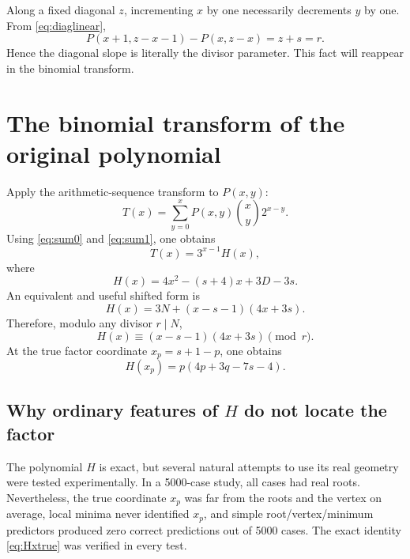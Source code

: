 \documentclass[11pt,a4paper]{article}
\begin{document}
Along a fixed diagonal \(z\), incrementing \(x\) by one necessarily decrements \(y\) by one. From \eqref{eq:diaglinear},
\begin{equation}
\boxed{
P(x+1,z-x-1)-P(x,z-x)=z+s=r.
}
\label{eq:slope}
\end{equation}
Hence the diagonal slope is literally the divisor parameter. This fact will reappear in the binomial transform.

\section{The binomial transform of the original polynomial}
\label{sec:H}

Apply the arithmetic-sequence transform to \(P(x,y)\):
\begin{equation}
T(x)=\sum_{y=0}^{x}P(x,y)\binom{x}{y}2^{x-y}.
\label{eq:T}
\end{equation}
Using \eqref{eq:sum0} and \eqref{eq:sum1}, one obtains
\begin{equation}
\boxed{
T(x)=3^{x-1}H(x),
}
\label{eq:T-H}
\end{equation}
where
\begin{equation}
\boxed{
H(x)=4x^2-(s+4)x+3D-3s.
}
\label{eq:H}
\end{equation}
An equivalent and useful shifted form is
\begin{equation}
\boxed{
H(x)=3N+(x-s-1)(4x+3s).
}
\label{eq:Hshift}
\end{equation}
Therefore, modulo any divisor \(r\mid N\),
\begin{equation}
\boxed{
H(x)\equiv(x-s-1)(4x+3s)\pmod r.
}
\label{eq:Hmod}
\end{equation}
At the true factor coordinate \(x_p=s+1-p\), one obtains
\begin{equation}
\boxed{
H(x_p)=p(4p+3q-7s-4).
}
\label{eq:Hxtrue}
\end{equation}

\subsection{Why ordinary features of \(H\) do not locate the factor}

The polynomial \(H\) is exact, but several natural attempts to use its real geometry were tested experimentally. In a 5000-case study, all cases had real roots. Nevertheless, the true coordinate \(x_p\) was far from the roots and the vertex on average, local minima never identified \(x_p\), and simple root/vertex/minimum predictors produced zero correct predictions out of 5000 cases. The exact identity \eqref{eq:Hxtrue} was verified in every test.
\end{document}
